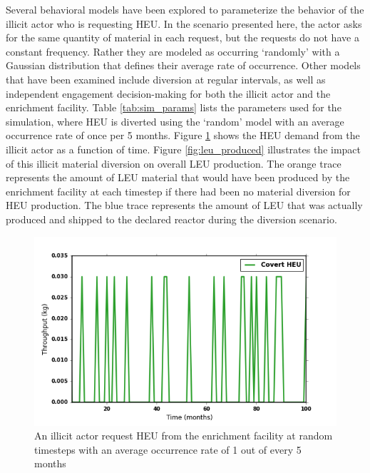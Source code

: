 Several behavioral models have been explored to parameterize the behavior of the illicit actor who is requesting \gls{HEU}.   In the scenario presented here, the actor asks for the same quantity of material in each request, but the requests do not have a constant frequency. Rather they are modeled as occurring `randomly' with a Gaussian distribution that defines their average rate of occurrence.  Other models that have been examined include diversion at regular intervals, as well as independent engagement decision-making for both the illicit actor and the enrichment facility.  Table \ref{tab:sim_params} lists the parameters used for the simulation, where \gls{HEU} is diverted using the `random' model with an average occurrence rate of once per 5 months.  Figure \ref{fig:heu_demand} shows the \gls{HEU} demand from the illicit actor as a function of time.  Figure \ref{fig:leu_produced} illustrates the impact of this illicit material diversion on overall \gls{LEU} production.  The orange trace represents the amount of \gls{LEU} material that would have been produced by the enrichment facility at each timestep if there had been no material diversion for \gls{HEU} production.  The blue trace represents the amount of \gls{LEU} that was actually produced and shipped to the declared reactor during the diversion scenario.


\begin{figure}
\begin{center}
\includegraphics[natwidth=162bp,natheight=227bp, scale=0.7]{./figs/HEU_R5.png}
\end{center}
\caption{An illicit actor request \gls{HEU} from the enrichment facility at random timesteps with an average occurrence rate of 1 out of every 5 months }
\label{fig:heu_demand}
\end{figure}

